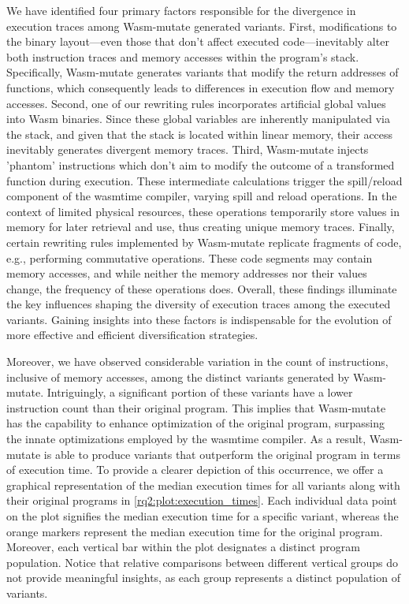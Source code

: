 \documentclass[sigplan,screen]{acmart}
\newcommand{\tool}{Wasm-mutate\xspace}
\newcommand{\wasm}{Wasm\xspace}
\begin{document}
We have identified four primary factors responsible for the divergence in execution traces among \tool generated variants.
First, modifications to the binary layout—even those that don't affect executed code—inevitably alter both instruction traces and memory accesses within the program's stack. 
Specifically, \tool generates variants that modify the return addresses of functions, which consequently leads to differences in execution flow and memory accesses.
Second, one of our rewriting rules incorporates artificial global values into \wasm binaries. 
Since these global variables are inherently manipulated via the stack, and given that the stack is located within linear memory, their access inevitably generates divergent memory traces.
Third, \tool injects 'phantom' instructions which don't aim to modify the outcome of a transformed function during execution. 
These intermediate calculations trigger the spill/reload component of the wasmtime compiler, varying spill and reload operations. 
In the context of limited physical resources, these operations temporarily store values in memory for later retrieval and use, thus creating unique memory traces.
Finally, certain rewriting rules implemented by \tool replicate fragments of code, e.g., performing commutative operations. 
These code segments may contain memory accesses, and while neither the memory addresses nor their values change, the frequency of these operations does.
Overall, these findings illuminate the key influences shaping the diversity of execution traces among the executed variants. 
Gaining insights into these factors is indispensable for the evolution of more effective and efficient diversification strategies.







Moreover, we have observed considerable variation in the count of instructions, inclusive of memory accesses, among the distinct variants generated by \tool.
Intriguingly, a significant portion of these variants have a lower instruction count than their original program. 
This implies that \tool has the capability to enhance optimization of the original program, surpassing the innate optimizations employed by the wasmtime compiler. 
As a result, \tool is able to produce variants that outperform the original program in terms of execution time.
To provide a clearer depiction of this occurrence, we offer a graphical representation of the median execution times for all variants along with their original programs in \autoref{rq2:plot:execution_times}. 
Each individual data point on the plot signifies the median execution time for a specific variant, whereas the orange markers represent the median execution time for the original program.
Moreover, each vertical bar within the plot designates a distinct program population. 
Notice that relative comparisons between different vertical groups do not provide meaningful insights, as each group represents a distinct population of variants.
\end{document}
